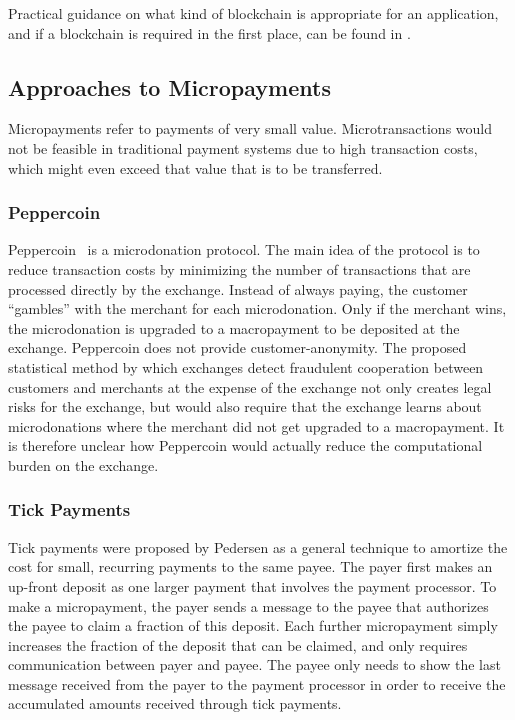 Practical guidance on what kind of blockchain is appropriate for an
application, and if a blockchain is required in the first place, can be found
in \cite{wust2017you}.


\subsection{Approaches to Micropayments}
Micropayments refer to payments of very small value. Microtransactions would
not be feasible in traditional payment systems due to high transaction costs,
which might even exceed that value that is to be transferred.

\subsubsection{Peppercoin}

Peppercoin~\cite{rivest2004peppercoin} is a microdonation protocol.
The main idea of the protocol is to reduce transaction costs by
minimizing the number of transactions that are processed directly by
the exchange.  Instead of always paying, the customer ``gambles'' with the
merchant for each microdonation.  Only if the merchant wins, the
microdonation is upgraded to a macropayment to be deposited at the
exchange.  Peppercoin does not provide customer-anonymity.  The proposed
statistical method by which exchanges detect fraudulent cooperation between
customers and merchants at the expense of the exchange not only creates
legal risks for the exchange, but would also require that the exchange learns
about microdonations where the merchant did not get upgraded to a
macropayment.  It is therefore unclear how Peppercoin would actually
reduce the computational burden on the exchange.

\subsubsection{Tick Payments}
Tick payments were proposed by Pedersen \cite{pedersen1996electronic} as a
general technique to amortize the cost for small, recurring payments to the
same payee.  The payer first makes an up-front deposit as one larger payment
that involves the payment processor.  To make a micropayment, the payer sends a
message to the payee that authorizes the payee to claim a fraction of this
deposit.  Each further micropayment simply increases the fraction of the
deposit that can be claimed, and only requires communication between payer and
payee.  The payee only needs to show the last message received from the payer
to the payment processor in order to receive the accumulated amounts received
through tick payments.

